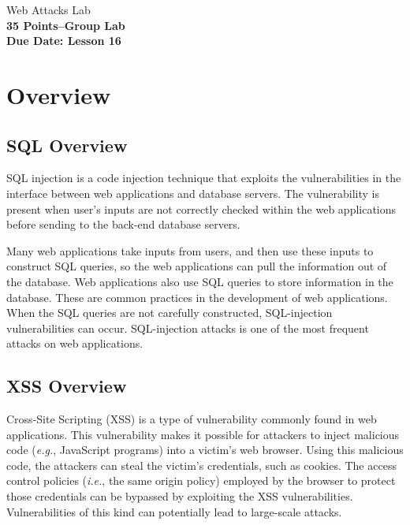 \documentclass{article}
\begin{document}
\begin{center}
{\LARGE Web Attacks
Lab\\}
\textbf{35 Points--Group Lab }\\
\textbf{Due Date: Lesson 16}
\end{center}

\copyrightnoticeA

\section{Overview}
\subsection{SQL Overview}

SQL injection is a code injection technique that exploits the 
vulnerabilities in the interface between web applications and 
database servers. The vulnerability is present when user's inputs 
are not correctly checked within the web applications 
before sending to the back-end database servers.

Many web applications take inputs from users, and then use these
inputs to construct SQL queries, so the web applications
can pull the information out of the database. 
Web applications also use SQL queries to store information in
the database. These are common practices in the development of web applications.
When the SQL queries are not carefully constructed, 
SQL-injection vulnerabilities can occur. 
SQL-injection attacks is one of the most frequent 
attacks on web applications.

\subsection{XSS Overview}

Cross-Site Scripting (XSS) is a type of vulnerability commonly found in web applications. This vulnerability makes it possible for attackers to inject malicious code (\emph{e.g.}, JavaScript programs) into a victim's web browser. Using this malicious code, the attackers can steal the victim's credentials, such as cookies. The access control policies (\emph{i.e.}, the same origin policy) employed by the browser to protect those credentials can be bypassed by exploiting the XSS vulnerabilities. Vulnerabilities of this kind can potentially lead to large-scale attacks. 
\end{document}
